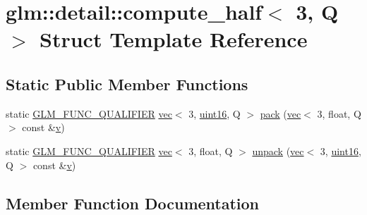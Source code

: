 \hypertarget{structglm_1_1detail_1_1compute__half_3_013_00_01_q_01_4}{}\section{glm\+:\+:detail\+:\+:compute\+\_\+half$<$ 3, Q $>$ Struct Template Reference}
\label{structglm_1_1detail_1_1compute__half_3_013_00_01_q_01_4}
\subsection*{Static Public Member Functions}
\begin{DoxyCompactItemize}
\item 
static \hyperlink{setup_8hpp_a33fdea6f91c5f834105f7415e2a64407}{G\+L\+M\+\_\+\+F\+U\+N\+C\+\_\+\+Q\+U\+A\+L\+I\+F\+I\+ER} \hyperlink{structglm_1_1vec}{vec}$<$ 3, \hyperlink{namespaceglm_1_1detail_a47b2a7d006d187338e8031a352d1ce56}{uint16}, Q $>$ \hyperlink{structglm_1_1detail_1_1compute__half_3_013_00_01_q_01_4_a87afcb72dac066fcd514bbd8071980d8}{pack} (\hyperlink{structglm_1_1vec}{vec}$<$ 3, float, Q $>$ const \&\hyperlink{_s_d_l__opengl_8h_a10a82eabcb59d2fcd74acee063775f90}{v})
\item 
static \hyperlink{setup_8hpp_a33fdea6f91c5f834105f7415e2a64407}{G\+L\+M\+\_\+\+F\+U\+N\+C\+\_\+\+Q\+U\+A\+L\+I\+F\+I\+ER} \hyperlink{structglm_1_1vec}{vec}$<$ 3, float, Q $>$ \hyperlink{structglm_1_1detail_1_1compute__half_3_013_00_01_q_01_4_a888b7245229f861127dedbacf10e1568}{unpack} (\hyperlink{structglm_1_1vec}{vec}$<$ 3, \hyperlink{namespaceglm_1_1detail_a47b2a7d006d187338e8031a352d1ce56}{uint16}, Q $>$ const \&\hyperlink{_s_d_l__opengl_8h_a10a82eabcb59d2fcd74acee063775f90}{v})
\end{DoxyCompactItemize}


\subsection{Member Function Documentation}
\mbox{\label{structglm_1_1detail_1_1compute__half_3_013_00_01_q_01_4_a87afcb72dac066fcd514bbd8071980d8}} 
